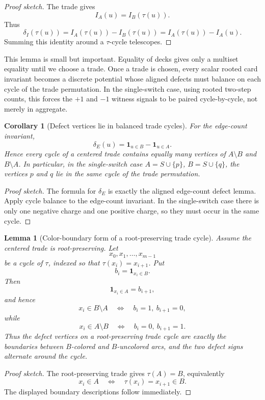 \documentclass[11pt]{article}
\newtheorem{lemma}{Lemma}
\newtheorem{corollary}{Corollary}
\newcommand{\one}{\mathbf{1}}
\begin{document}
\begin{proof}[Proof sketch]
The trade gives
\[
  I_A(u)=I_B(\tau(u)).
\]
Thus
\[
  \delta_I(\tau(u))
  =
  I_A(\tau(u))-I_B(\tau(u))
  =
  I_A(\tau(u))-I_A(u).
\]
Summing this identity around a \(\tau\)-cycle telescopes.
\end{proof}

This lemma is small but important.  Equality of decks gives only a multiset
equality until we choose a trade.  Once a trade is chosen, every scalar rooted
card invariant becomes a discrete potential whose aligned defects must
balance on each cycle of the trade permutation.  In the single-switch case,
using rooted two-step counts, this forces the \(+1\) and \(-1\) witness
signals to be paired cycle-by-cycle, not merely in aggregate.

\begin{corollary}[Defect vertices lie in balanced trade cycles]
For the edge-count invariant,
\[
  \delta_E(u)=\one_{u\in B}-\one_{u\in A}.
\]
Hence every cycle of a centered trade contains equally many vertices of
\(A\setminus B\) and \(B\setminus A\).  In particular, in the single-switch
case \(A=S\cup\{p\}\), \(B=S\cup\{q\}\), the vertices \(p\) and \(q\) lie in
the same cycle of the trade permutation.
\end{corollary}

\begin{proof}[Proof sketch]
The formula for \(\delta_E\) is exactly the aligned edge-count defect lemma.
Apply cycle balance to the edge-count invariant.  In the single-switch case
there is only one negative charge and one positive charge, so they must occur
in the same cycle.
\end{proof}

\begin{lemma}[Color-boundary form of a root-preserving trade cycle]
Assume the centered trade is root-preserving.  Let
\[
  x_0,x_1,\ldots,x_{m-1}
\]
be a cycle of \(\tau\), indexed so that \(\tau(x_i)=x_{i+1}\).  Put
\[
  b_i=\one_{x_i\in B}.
\]
Then
\[
  \one_{x_i\in A}=b_{i+1},
\]
and hence
\[
  x_i\in B\setminus A
  \quad\Longleftrightarrow\quad
  b_i=1,\ b_{i+1}=0,
\]
while
\[
  x_i\in A\setminus B
  \quad\Longleftrightarrow\quad
  b_i=0,\ b_{i+1}=1.
\]
Thus the defect vertices on a root-preserving trade cycle are exactly the
boundaries between \(B\)-colored and \(B\)-uncolored arcs, and the two defect
signs alternate around the cycle.
\end{lemma}

\begin{proof}[Proof sketch]
The root-preserving trade gives \(\tau(A)=B\), equivalently
\[
  x_i\in A
  \quad\Longleftrightarrow\quad
  \tau(x_i)=x_{i+1}\in B.
\]
The displayed boundary descriptions follow immediately.
\end{proof}
\end{document}
